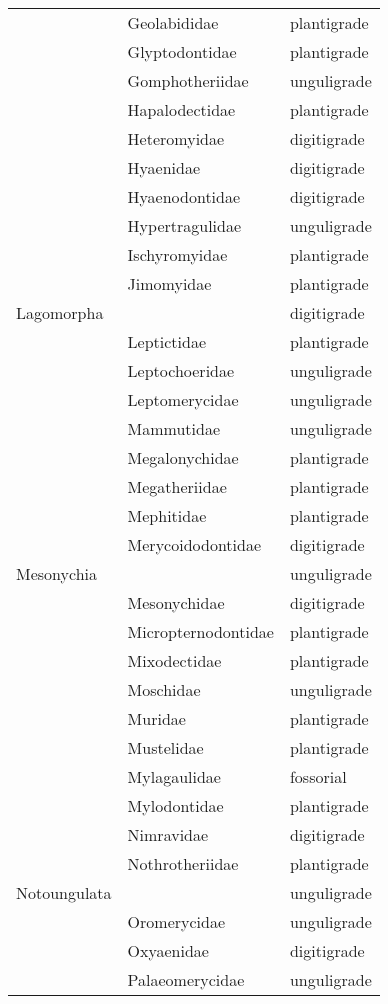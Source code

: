 \begin{center}
\begin{longtable}{ l l l }
    & Geolabididae & plantigrade \\ 
    & Glyptodontidae & plantigrade \\ 
    & Gomphotheriidae & unguligrade \\ 
    & Hapalodectidae & plantigrade \\ 
    & Heteromyidae & digitigrade \\ 
    & Hyaenidae & digitigrade \\ 
    & Hyaenodontidae & digitigrade \\ 
    & Hypertragulidae & unguligrade \\ 
    & Ischyromyidae & plantigrade \\ 
    & Jimomyidae & plantigrade \\ 
    Lagomorpha &  & digitigrade \\ 
    & Leptictidae & plantigrade \\ 
    & Leptochoeridae & unguligrade \\ 
    & Leptomerycidae & unguligrade \\ 
    & Mammutidae & unguligrade \\ 
    & Megalonychidae & plantigrade \\ 
    & Megatheriidae & plantigrade \\ 
    & Mephitidae & plantigrade \\ 
    & Merycoidodontidae & digitigrade \\ 
    Mesonychia &  & unguligrade \\ 
    & Mesonychidae & digitigrade \\ 
    & Micropternodontidae & plantigrade \\ 
    & Mixodectidae & plantigrade \\ 
    & Moschidae & unguligrade \\ 
    & Muridae & plantigrade \\ 
    & Mustelidae & plantigrade \\ 
    & Mylagaulidae & fossorial \\ 
    & Mylodontidae & plantigrade \\ 
    & Nimravidae & digitigrade \\ 
    & Nothrotheriidae & plantigrade \\ 
    Notoungulata &  & unguligrade \\ 
    & Oromerycidae & unguligrade \\ 
    & Oxyaenidae & digitigrade \\ 
    & Palaeomerycidae & unguligrade \\ 

\end{longtable}
\end{center}
